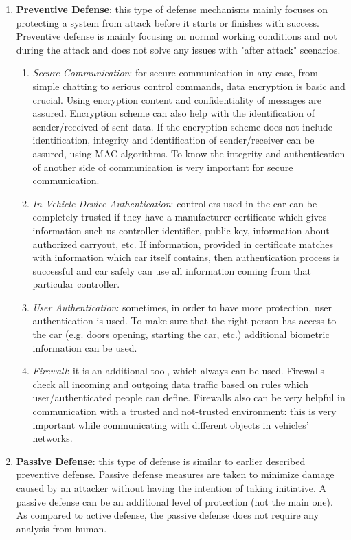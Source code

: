 	\begin{enumerate}
		\item \textbf{Preventive Defense}: this type of defense mechanisms mainly focuses on protecting a system from attack before it starts or finishes with success. Preventive defense is mainly focusing on normal working conditions and not during the attack and does not solve any issues with "after attack" scenarios.	
		\begin{enumerate}
			\item \textit{Secure Communication}: for secure communication in any case, from simple chatting to serious control commands, data encryption is basic and crucial. Using encryption content and confidentiality of messages are assured. Encryption scheme can also help with the identification of sender/received of sent data. If the encryption scheme does not include identification, integrity and identification of sender/receiver can be assured, using \gls{MAC} algorithms. To know the integrity and authentication of another side of communication is very important for secure communication.
			\item \textit{In-Vehicle Device Authentication}: controllers used in the car can be completely trusted if they have a manufacturer certificate which gives information such us controller identifier, public key, information about authorized carryout, etc. If information, provided in certificate matches with information which car itself contains, then authentication process is successful and car safely can use all information coming from that particular controller.  
			\item \textit{User Authentication}: sometimes, in order to have more protection, user authentication is used. To make sure that the right person has access to the car (e.g. doors opening, starting the car, etc.) additional biometric information can be used. 
			\item \textit{Firewall}: it is an additional tool, which always can be used. Firewalls check all incoming and outgoing data traffic based on rules which user/authenticated people can define. Firewalls also can be very helpful in communication with a trusted and not-trusted environment: this is very important while communicating with different objects in vehicles' networks.
		\end{enumerate}		
		\item \textbf{Passive Defense}: this type of defense is similar to earlier described preventive defense. Passive defense measures are taken to minimize damage caused by an attacker without having the intention of taking initiative. A passive defense can be an additional level of protection (not the main one). As compared to active defense, the passive defense does not require any analysis from human.		

\end{enumerate}
